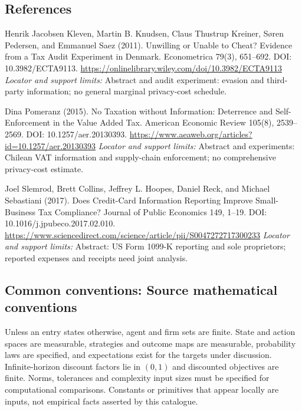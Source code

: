 \documentclass[11pt,a4paper]{article}
\begin{document}
\subsection*{References}
\begin{enumerate}[label={[S\arabic*]},leftmargin=*,itemsep=0.6em]
\item Henrik Jacobsen Kleven, Martin B. Knudsen, Claus Thustrup Kreiner, Søren Pedersen, and Emmanuel Saez (2011). Unwilling or Unable to Cheat? Evidence from a Tax Audit Experiment in Denmark. Econometrica 79(3), 651--692. DOI: 10.3982/ECTA9113.
\url{https://onlinelibrary.wiley.com/doi/10.3982/ECTA9113}
\newline\emph{Locator and support limits:} Abstract and audit experiment: evasion and third-party information; no general marginal privacy-cost schedule.
\item Dina Pomeranz (2015). No Taxation without Information: Deterrence and Self-Enforcement in the Value Added Tax. American Economic Review 105(8), 2539--2569. DOI: 10.1257/aer.20130393.
\url{https://www.aeaweb.org/articles?id=10.1257/aer.20130393}
\newline\emph{Locator and support limits:} Abstract and experiments: Chilean VAT information and supply-chain enforcement; no comprehensive privacy-cost estimate.
\item Joel Slemrod, Brett Collins, Jeffrey L. Hoopes, Daniel Reck, and Michael Sebastiani (2017). Does Credit-Card Information Reporting Improve Small-Business Tax Compliance? Journal of Public Economics 149, 1--19. DOI: 10.1016/j.jpubeco.2017.02.010.
\url{https://www.sciencedirect.com/science/article/pii/S0047272717300233}
\newline\emph{Locator and support limits:} Abstract: US Form 1099-K reporting and sole proprietors; reported expenses and receipts need joint analysis.
\end{enumerate}

\subsection*{Common conventions: Source mathematical conventions}

Unless an entry states otherwise, agent and firm sets are finite. State and action spaces are measurable, strategies and outcome maps are measurable, probability laws are specified, and expectations exist for the targets under discussion. Infinite-horizon discount factors lie in $(0,1)$ and discounted objectives are finite. Norms, tolerances and complexity input sizes must be specified for computational comparisons. Constants or primitives that appear locally are inputs, not empirical facts asserted by this catalogue.
\end{document}
